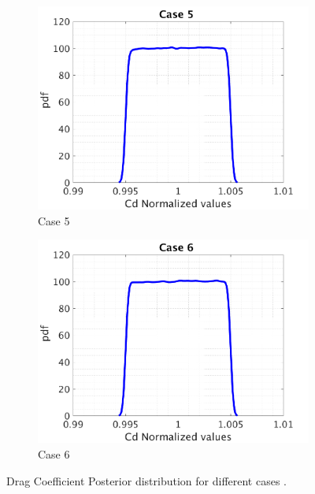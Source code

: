 \documentclass{article}
\begin{document}
\begin{figure}[H]
\begin{center}
\begin{subfigure}{0.4\textwidth}
    \centering\includegraphics[width=1.1\textwidth,keepaspectratio]{images/inverse_problem/infer_drag/case5/cdraw_PDF.png}
    \caption{\centering Case 5}
  \end{subfigure}
  \begin{subfigure}{0.4\textwidth}
    \centering\includegraphics[width=1.1\textwidth,keepaspectratio]{images/inverse_problem/infer_drag/case6/cdraw_PDF.png}
    \caption{\centering Case 6}
  \end{subfigure}

\caption{Drag Coefficient Posterior distribution for different cases .}
\label{fig:cd_cases} 
 \end{center}
\end{figure}
\end{document}
